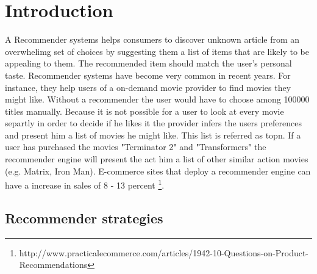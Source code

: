 \section{Introduction}
\label{sec:intro}

A Recommender systems helps consumers to discover unknown article from an overwhelimg set of choices by suggesting them a list of items that are likely to be appealing to them. The recommended item should match the user's personal taste.
Recommender systems have become very common in recent years. 
For instance, they help users of a on-demand movie provider to find movies they might like. Without a recommender the user would have to choose among 100000 titles manually. Because it is not possible for a user to look at every movie separtly in order to decide if he likes it the provider infers the users preferences and present him a list of movies he might like. This list is referred as \gls{topn}. If a user has purchased the movies "Terminator 2" and "Transformers" the recommender engine will present the act him a list of other similar action movies (e.g. Matrix, Iron Man).
E-commerce sites that deploy a recommender engine can have a increase in sales of 8 - 13 percent \footnote{http://www.practicalecommerce.com/articles/1942-10-Questions-on-Product-Recommendations}.

\subsection{Recommender strategies}
\label{sec:strategies}

